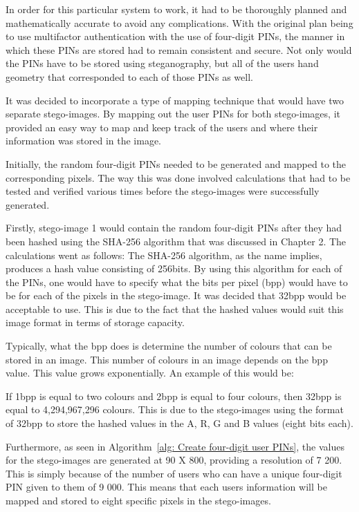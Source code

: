 In order for this particular system to work, it had to be thoroughly planned and mathematically accurate to avoid any complications. With the original plan being to use multifactor authentication with the use of four-digit PINs, the manner in which these PINs are stored had to remain consistent and secure. Not only would the PINs have to be stored using steganography, but all of the users hand geometry that corresponded to each of those PINs as well. 

It was decided to incorporate a type of mapping technique that would have two separate stego-images. By mapping out the user PINs for both stego-images, it provided an easy way to map and keep track of the users and where their information was stored in the image. 

Initially, the random four-digit PINs needed to be generated and mapped to the corresponding pixels. The way this was done involved calculations that had to be tested and verified various times before the stego-images were successfully generated. 

Firstly, stego-image 1 would contain the random four-digit PINs after they had been hashed using the SHA-256 algorithm that was discussed in Chapter 2. The calculations went as follows:
The SHA-256 algorithm, as the name implies, produces a hash value consisting of 256bits. 
By using this algorithm for each of the PINs, one would have to specify what the bits per pixel (bpp) would have to be for each of the pixels in the stego-image. It was decided that 32bpp would be acceptable to use. This is due to the fact that the hashed values would suit this image format in terms of storage capacity.

Typically, what the bpp does is determine the number of colours that can be stored in an image. This number of colours in an image depends on the bpp value. This value grows exponentially. An example of this would be: 

If 1bpp is equal to two colours and 2bpp is equal to four colours, then 32bpp is equal to 4,294,967,296 colours. This is due to the stego-images using the format of 32bpp to store the hashed values in the A, R, G and B values (eight bits each).

Furthermore, as seen in Algorithm~\ref{alg: Create four-digit user PINs}, the values for the stego-images are generated at 90 X 800, providing a resolution of 7 200. This is simply because of the number of users who can have a unique four-digit PIN given to them of 9 000. This means that each users information will be mapped and stored to eight specific pixels in the stego-images. 

